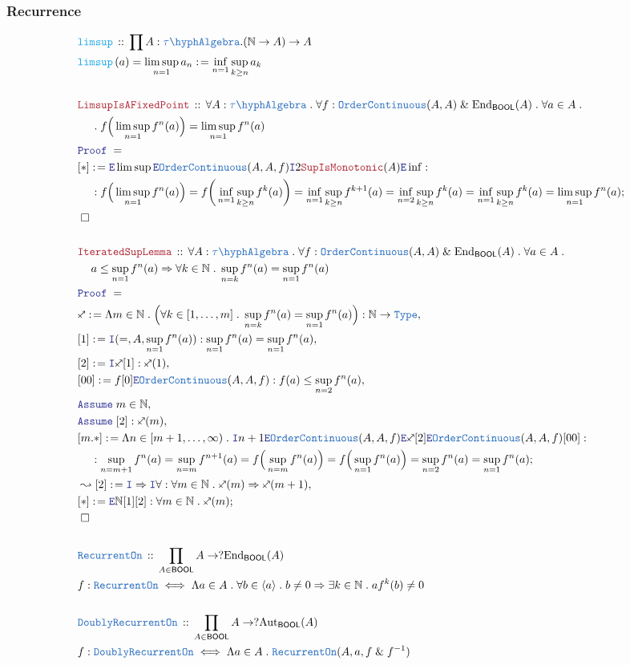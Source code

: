 \documentclass[12pt]{scrartcl}
\newcommand{\TYPE}[1]{\textcolor{NavyBlue}{\mathtt{#1}}}
\newcommand{\FUNC}[1]{\textcolor{Cerulean}{\mathtt{#1}}}
\newcommand{\LOGIC}[1]{\textcolor{Blue}{\mathtt{#1}}}
\newcommand{\THM}[1]{\textcolor{Maroon}{\mathtt{#1}}}
\renewcommand{\.}{\; . \;}
\newcommand{\de}{: \kern 0.1pc =}
\newcommand{\Act}[1]{\left( #1 \right)}
\newcommand{\Theorem}[2]{& \THM{#1} \, :: \, #2 \\ & \Proof = \\ }
\newcommand{\DeclareType}[2]{& \TYPE{#1} \, :: \, #2 \\}
\newcommand{\DefineType}[3]{& #1 : \TYPE{#2} \iff #3 \\}
\newcommand{\DeclareFunc}[2]{& \FUNC{#1} \, :: \, #2 \\}
\newcommand{\DefineNamedFunc}[4]{&  \FUNC{#1}\Act{#2} = #3 \de #4 \\}
\newcommand{\NewLine}{\\ & \kern 1pc}
\newcommand{\Page}[1]{ \begin{align*} #1 \end{align*}   }
\renewcommand{\And}{\; \& \;}
\newcommand{\Imply}{\Rightarrow}
\newcommand{\Intro}{\LOGIC{I}}
\newcommand{\Elim}{\LOGIC{E}}
\newcommand{\Type}{\TYPE{Type}}
\newcommand{\Nat}{\mathbb{N} }
\newcommand{\End}{\mathrm{End}}
\newcommand{\Aut}{\mathrm{Aut}}
\newcommand{\Say}[3]{& #1 \de #2 : #3, \\}
\newcommand{\Conclude}[3]{& #1 \de #2 : #3; \\}
\newcommand{\Derive}[3]{& \leadsto #1 \de #2 : #3, \\}
\newcommand{\Assume}[2]{& \LOGIC{Assume} \; #1 : #2, \\}
\newcommand{\AssumeIn}[2]{& \LOGIC{Assume} \; #1 \in #2, \\}
\newcommand{\QED}{\; \square}
\newcommand{\EndProof}{& \QED \\}
\newcommand{\Proof}{\LOGIC{Proof} \; }
\newcommand{\oC}{\TYPE{OrderContinuous}}
\newcommand{\TAlgebra}{\TYPE{\tau\hyph Algebra}}
\newcommand{\BOOL}{\mathsf{BOOL}}
\begin{document}
\subsubsection{Recurrence}
\Page{
	\DeclareFunc{limsup}{\prod A : \TAlgebra . (\Nat \to A) \to A}
	\DefineNamedFunc{limsup}{a}{\limsup_{n=1} a_n}
	{
		\inf_{n=1} \sup_{k \ge n} a_k
	}
	\\
	\Theorem{LimsupIsAFixedPoint}
	{
		\forall A : \TAlgebra \.
		\forall f  : \oC(A,A) \And \End_\BOOL(A) \.
		\forall a \in A \.  \NewLine \.
		f \Big( \limsup_{n=1} f^n(a)  \Big) = 
		\limsup_{n=1} f^n(a)
	}
	\Conclude{[*]}{
		\Elim \limsup
		\Elim \oC(A,A,f)
		\Intro 2
		\THM{SupIsMonotonic}(A)\Elim \inf	
	}
	{
			\NewLine :			
			f \Big( \limsup_{n=1} f^n(a)  \Big) = 
			f \bigg(  \inf_{n=1} \sup_{k \ge n} f^k(a)  \bigg) = 
			\inf_{n=1} \sup_{k \ge n} f^{k+1}(a) =
			\inf_{n=2} \sup_{k \ge n} f^{k}(a) =
			\inf_{n=1} \sup_{k \ge n} f^{k}(a) =
			\limsup_{n=1} f^n(a)
	}
	\EndProof
	\\
	\Theorem{IteratedSupLemma}
	{
		\forall A : \TAlgebra \. 
		\forall f  : \oC(A,A) \And \End_\BOOL(A) \.
		\forall a \in A \.
		\NewLine
		a \le \sup_{n=1} f^n(a) \Imply
		\forall k \in \Nat \.
		\sup_{n = k} f^n(a) =  \sup_{n = 1} f^n(a) 
	}
	\Say{\sagittarius}{
		\Lambda m \in \Nat \.
		\Big( \forall k \in [1,\ldots,m] \.  
			\sup_{n = k} f^n(a) =  \sup_{n = 1} f^n(a)
		\Big)
	}{ \Nat \to \Type  }
	\Say{[1]}{\Intro(=,A,\sup_{n = 1} f^n(a))}
	{
		\sup_{n = 1} f^n(a) = \sup_{n = 1} f^n(a)
	}
	\Say{[2]}{\Intro \sagittarius [1] }
	{
		\sagittarius(1) 
	}
	\Say{[00]}{f[0] \Elim \oC(A,A,f)}
	{
		f(a) \le \sup_{n = 2}  f^n(a)
	}
	\AssumeIn{m}{\Nat}
	\Assume{[2]}{\sagittarius(m)}
	\Conclude{[m.*]}{
		\Lambda n \in [ m + 1, \ldots, \infty) \.
		\Intro n + 1
		\Elim \oC(A,A,f)
		\Elim \sagittarius [2]
		\Elim \oC(A,A,f)
		[00]
	}
	{
		\NewLine :		
		\sup_{n = m + 1} f^n(a) =
		\sup_{n = m}  f^{n+1}(a)    =
		f\Big( \sup_{n = m}  f^n(a) \Big) = 
		f\Big( \sup_{n = 1}  f^n(a) \Big) =
		\sup_{n = 2}  f^n(a) =
		\sup_{n = 1}  f^n(a)
 	}
 	\Derive{[2]}{\Intro \Imply \Intro \forall}
 	{
 		\forall m \in \Nat \.
 		\sagittarius(m) \Imply \sagittarius(m+1) 
 	}
 	\Conclude{[*]}{\Elim \Nat [1][2]}{
 		\forall m \in \Nat \. 
 		\sagittarius(m) 
 	}
 	\EndProof	
	\\
	\DeclareType{RecurrentOn}{\prod_{A \in \BOOL} A \to ?\End_\BOOL(A)}
	\DefineType{f}{RecurrentOn}
	{
		\Lambda	a \in A \. 
		\forall b \in \langle a \rangle \. 
		b \neq 0 
		\Imply
		\exists k \in \Nat \.   af^k(b) \neq 0
	}
	\\
	\DeclareType{DoublyRecurrentOn}{\prod_{A \in \BOOL} A \to ?\Aut_\BOOL(A)}
	\DefineType{f}{DoublyRecurrentOn}
	{
		\Lambda	a \in A \. 
		\TYPE{RecurrentOn}(A,a, f \And f^{-1} )
	}
}
\end{document}
